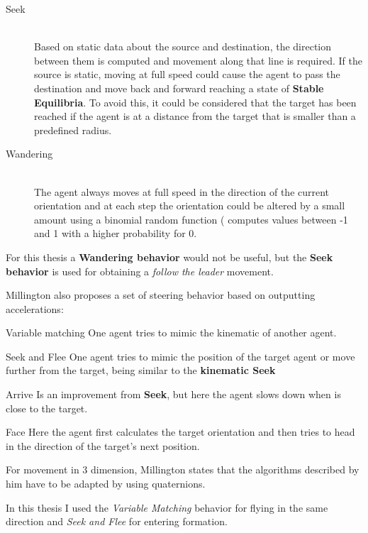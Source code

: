 \begin{description}
\item [Seek] \hfill \\ Based on static data about the source and destination, the direction
between them is computed and movement along that line is required. If the source
is static, moving at full speed could cause the agent to pass the destination
and move back and forward reaching a state of \textbf{Stable Equilibria}. To 
avoid this, it could be considered that the target has been reached if the 
agent is at a distance from the target that is smaller than a predefined
radius.
\item [Wandering] \hfill \\ The agent always moves at full speed in the direction
of the current orientation and at each step the orientation could be
altered by a small amount using a binomial random function ( computes values between
-1 and 1 with a higher probability for 0.
\end{description}

For this thesis a \textbf{Wandering behavior} would not be useful, but the 
\textbf{Seek behavior} is used for obtaining a \textit{follow the leader} movement.

Millington also proposes a set of steering behavior based on outputting accelerations:
\begin{description}
\item {Variable matching} One agent tries to mimic the kinematic of another agent.
\item {Seek and Flee} One agent tries to mimic the position of the target agent
or move further from the target, being similar to the \textbf{kinematic Seek}
\item {Arrive} Is an improvement from \textbf{Seek}, but here the agent slows 
down when is close to the target.
\item {Face} Here the agent first calculates the target orientation and then
tries to head in the direction of the target's next position.
\end{description}

For movement in 3 dimension, Millington states that the algorithms described by
him have to be adapted by using quaternions.

In this thesis I used the \textit{Variable Matching} behavior for flying in the
same direction and \textit{Seek and Flee} for entering formation.